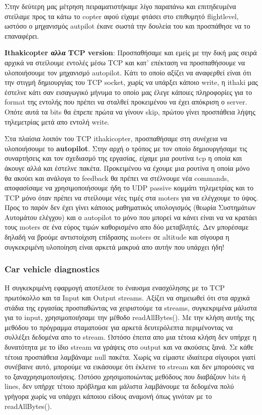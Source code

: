 \documentclass[hidelinks, 12pt, a4paper]{article}
\begin{document}
Στην δεύτερη μας μέτρηση πειραματιστήκαμε λίγο παραπάνω και επιτηδευμένα στείλαμε προς τα κάτω το copter αφού είχαμε φτάσει στο επιθυμητό flightlevel, ωστόσο ο μηχανισμός autpilot έκανε σωστά την δουλεία του και προσπάθησε να το επαναφέρει.


\textbf{Ithakicopter αλλα TCP version}: Προσπαθήσαμε και εμείς με την δική μας σειρά αρχικά να στείλουμε εντολές μέσω TCP και κατ' επέκταση να προσπαθήσουμε να υλοποιήσουμε τον μηχανισμό autopilot. Κάτι το οποίο αξίζει να αναφερθεί είναι ότι την στιγμή δημιουργίας του TCP socket, χωρίς να υπάρξει κάποιο write, η ithaki μας έστελνε κάτι σαν εισαγωγικό μήνυμα το οποίο μας έλεγε κάποιες πληροφορίες για το format της εντολής που πρέπει να σταλθεί προκειμένου να έχει απόκριση ο server. Οπότε αυτά τα bits θα έπρεπε πρώτα να γίνουν skip, πρώτου γίνει προσπάθεια λήψης τηλεμετρίας μετά απο εντολή write. 

Στα πλαίσια λοιπόν του TCP ithakicopter, προσπαθήσαμε στη συνέχεια να υλοποιήσουμε το \textbf{autopilot}. Στην αρχή ο τρόπος με τον οποίο δημιουργήσαμε τις συναρτήσεις και τον σχεδιασμό της εργασίας, είχαμε μια ρουτίνα tcp η οποία και άκουγε αλλά και έστελνε πακέτα. Προκειμένου να έχουμε μια ρουτίνα η οποία μόνο θα ακούει και ανάλογα το feedback θα πρέπει να στέλνουμε νέα commands, αποφασίσαμε να χρησιμοποιήσουμε ήδη το  UDP passive κομμάτι τηλεμετρίας και το TCP μόνο όταν πρέπει να στείλουμε νέες τιμές στα moters για να ελέγχουμε το ύψος. Προς το παρόν δεν έχει γίνει κάποιος μαθηματικός υπολογισμός (θεωρία Συστημάτων Αυτομάτου ελέγχου) και ο autopilot το μόνο που μπορεί να κάνει είναι να να κρατάει τους moters σε ένα εύρος τιμών καθορισμένο απο δύο μεταβλητές. Δεν μπορέσαμε δηλαδή να βρούμε αντιστοίχιση επίδρασης moters σε altitude και σίγουρα η συγκεκριμένη υλοποίηση είναι αρκετά μακρυά απο αυτήν που υπάρχει ήδη! 

\subsubsection{Car vehicle diagnostics}

Η συγκεκριμένη εφαρμογή αποτέλεσε το έναυσμα ενασχόλησης με το TCP πρωτόκολλο και τα Input και Output streams. Αξίζει να σημειωθεί ότι στα αρχικά στάδια της εργασίας προσπαθώντας να χειριστούμε τα streams, συγκεκριμένα μάλιστα για το input, χρησιμοποιήσαμε την μέθοδο readAllBytes(). Με την κλήση αυτής της μεθόδου το πρόγραμμα σταματούσε για αρκετά δευτερόλεπτα περιμένοντας να συλλέξει δεδομένα απο το stream. Ωστόσο έπειτα απο μια τέτοια κλήση δεν υπήρχε η δυνατότητα με το ίδιο stream να γράψεις στο output και να ακούσεις ξανά. Σε κάθε τέτοια προσπάθεια λαμβάναμε null πακέτα. Χωρίς να είμαστε ιδιαίτερα σίγουροι γιατί συνέβαινε αυτό, μπορούμε να εικάσουμε ότι έκλεινε το stream και δεν μπορούσες να το ξαναχρησιμοποιήσεις. Ωστόσο χρησιμοποιώντας μεθόδους που διαβάζουν bits ή lines, δεν υπήρχε τέτοιο πρόβλημα και μάλιστα λαμβάνουμε τα δεδομένα πολύ γρήγορα χωρίς να υπάρχει κάποιου είδους αναμονή όπως γινόταν με το readAllBytes().  
\end{document}
